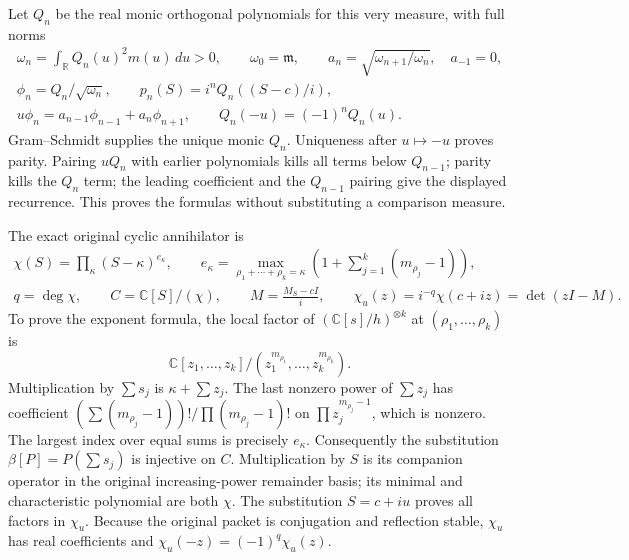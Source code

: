 \documentclass[11pt]{article}
\newcommand{\C}{\mathbb C}\newcommand{\R}{\mathbb R}
\begin{document}
Let $Q_n$ be the real monic orthogonal polynomials for this very
measure, with full norms
\begin{equation}\tag{NS3}\label{NS3}
\begin{gathered}
\omega_n=\int_\R Q_n(u)^2m(u)\,du>0,\qquad
\omega_0=\mathfrak m,\qquad a_n=\sqrt{\omega_{n+1}/\omega_n},
\quad a_{-1}=0,\\
\phi_n=Q_n/\sqrt{\omega_n},\qquad
p_n(S)=i^nQ_n((S-c)/i),\\
u\phi_n=a_{n-1}\phi_{n-1}+a_n\phi_{n+1},
\qquad Q_n(-u)=(-1)^nQ_n(u).
\end{gathered}
\end{equation}
Gram--Schmidt supplies the unique monic $Q_n$. Uniqueness after
$u\mapsto-u$ proves parity. Pairing $uQ_n$ with earlier
polynomials kills all terms below $Q_{n-1}$; parity kills the
$Q_n$ term; the leading coefficient and the $Q_{n-1}$ pairing
give the displayed recurrence. This proves the formulas without
substituting a comparison measure.

The exact original cyclic annihilator is
\begin{equation}\tag{NS4}\label{NS4}
\begin{gathered}
\chi(S)=\prod_\kappa(S-\kappa)^{e_\kappa},\qquad
e_\kappa=\max_{\rho_1+\cdots+\rho_k=\kappa}
 \left(1+\sum_{j=1}^k(m_{\rho_j}-1)\right),\\
q=\deg\chi,\qquad C=\C[S]/(\chi),\qquad
M=\frac{M_S-cI}{i},\qquad
\chi_u(z)=i^{-q}\chi(c+iz)=\det(zI-M).
\end{gathered}
\end{equation}
To prove the exponent formula, the local factor of
$(\C[s]/h)^{\otimes k}$ at $(\rho_1,\ldots,\rho_k)$ is
\[
\C[z_1,\ldots,z_k]/
       (z_1^{m_{\rho_1}},\ldots,z_k^{m_{\rho_k}}).
\]
Multiplication by $\sum s_j$ is $\kappa+\sum z_j$.
The last nonzero power of $\sum z_j$ has coefficient
$(\sum(m_{\rho_j}-1))!/\prod(m_{\rho_j}-1)!$ on
$\prod z_j^{m_{\rho_j}-1}$, which is nonzero.
The largest index over equal sums is precisely $e_\kappa$.
Consequently the substitution $\beta[P]=P(\sum s_j)$ is
injective on $C$. Multiplication by $S$ is its companion
operator in the original increasing-power remainder basis;
its minimal and characteristic polynomial are both $\chi$.
The substitution $S=c+iu$ proves all factors in $\chi_u$.
Because the original packet is conjugation and reflection
stable, $\chi_u$ has real coefficients and
$\chi_u(-z)=(-1)^q\chi_u(z)$.
\end{document}
